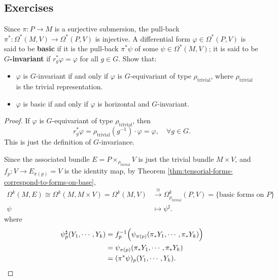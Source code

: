 \subsection*{Exercises}
\begin{exercise}
    Since $\pi:P\to M$ is a surjective submersion, 
    the pull-back $\pi^*:\Omega^*(M,V)\to \Omega^*(P,V)$ is injective. 
    A differential form $\varphi\in\Omega^*(P,V)$ is said to be \textbf{basic} 
    if it is the pull-back $\pi^*\psi$ of some $\psi\in\Omega^*(M,V)$; 
    it is said to be \textbf{$G$-invariant} if $r_g^*\varphi = \varphi$ for all $g\in G$. 
    Show that:
    \begin{itemize}[leftmargin=*]
        \item $\varphi$ is $G$-invariant if and only if 
        $\varphi$ is $G$-equivariant of type $\rho_{\mathrm{trivial}}$, 
        where $\rho_{\mathrm{trivial}}$ is the trivial representation.
        \item $\varphi$ is basic if and only if $\varphi$ is horizontal and $G$-invariant.
    \end{itemize}
\end{exercise}
\begin{proof}
    If $\varphi$ is $G$-equivariant of type $\rho_{\mathrm{trivial}}$, then 
    \begin{equation*}
        r_g^*\varphi = \rho_{\mathrm{trivial}}(g^{-1})\cdot\varphi = \varphi, \quad \forall g\in G.
    \end{equation*}
    This is just the definition of $G$-invariance. 

    Since the associated bundle $E=P\times_{\rho_{\mathrm{trivial}}} V$ is just the trivial bundle $M\times V$, 
    and $f_p: V\to E_{\pi(p)} = V$ is the identity map,
    by Theorem \ref{thm:tensorial-forms-correspond-to-forms-on-base}, 
    \begin{align*}
        \Omega^k(M,E)\cong\Omega^k(M, M\times V) = \Omega^k(M, V) &\xrightarrow{\cong} \Omega^k_{\rho_{\mathrm{trivial}}}(P, V) = \{\text{basic forms on $P$}\} \\ 
        \psi &\mapsto \psi^\sharp.
    \end{align*}
    where 
    \begin{align*}
        \psi^\sharp_p(Y_1, \cdots, Y_k) &= f_p^{-1}\Big(\psi_{\pi(p)}(\pi_*Y_1, \cdots, \pi_*Y_k)\Big) \\ 
        &= \psi_{\pi(p)}(\pi_*Y_1, \cdots, \pi_*Y_k) \\ 
        &= (\pi^*\psi)_p(Y_1, \cdots, Y_k). \qedhere
    \end{align*}
\end{proof}
